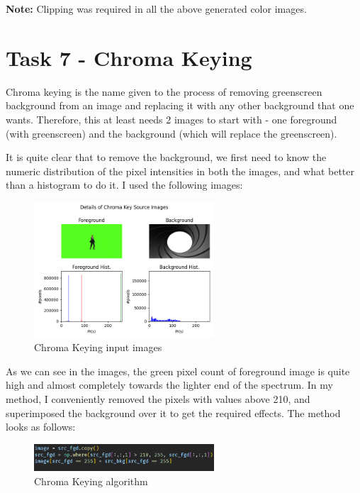 \documentclass[notitlepage]{report}
\begin{document}
\textbf{Note:} Clipping was required in all the above generated color images.

\section{Task 7 - Chroma Keying}
Chroma keying is the name given to the process of removing greenscreen background from an image and replacing 
it with any other background that one wants. Therefore, this at least needs 2 images to start with - one foreground (with greenscreen) 
and the background (which will replace the greenscreen).

It is quite clear that to remove the background, we first need to know the numeric distribution of the pixel intensities in both the images, 
and what better than a histogram to do it.
I used the following images:

\begin{figure}[htp]
    \centering
    \hypertarget{CK}{\includegraphics[width = 0.6\textwidth]{CK.png}}
    \caption{Chroma Keying input images}
    \label{fig13:sysfig}
\end{figure}

As we can see in the images, the green pixel count of foreground image is quite high and almost completely towards the lighter end
of the spectrum. In my method, I conveniently removed the pixels with values above 210, and superimposed the background over it to get the required
effects. The method looks as follows:

\begin{figure}[htp]
    \centering
    \hypertarget{C7}{\includegraphics[width = 0.6\textwidth]{C7.png}}
    \caption{Chroma Keying algorithm}
    \label{fig14:sysfig}
\end{figure}
\end{document}
